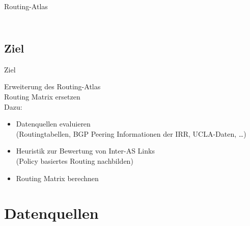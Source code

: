 \documentclass[ngerman,compress,hyperref={bookmarks}]{beamer}
\begin{document}
\begin{frame}[allowframebreaks]{Routing-Atlas}
\begin{columns}[c]
\begin{column}{0.5\textwidth}
\begin{figure}
      \end{figure}
    \end{column}
  \end{columns}
\end{frame}



\subsection{Ziel}
\begin{frame}{Ziel}
  \begin{center}
    {\Large Erweiterung des Routing-Atlas}\\
    \vspace{0.5cm}
    Routing Matrix ersetzen\\
    \vspace{0.5cm}
    Dazu:
    \begin{itemize}
      \item Datenquellen evaluieren\\{\scriptsize(Routingtabellen, BGP Peering Informationen der IRR, UCLA-Daten, \ldots)}
      \item Heuristik zur Bewertung von Inter-AS Links\\{\scriptsize(Policy basiertes Routing nachbilden)}
      \item Routing Matrix berechnen
    \end{itemize}
  \end{center}
\end{frame}


\section{Datenquellen}
\end{document}
